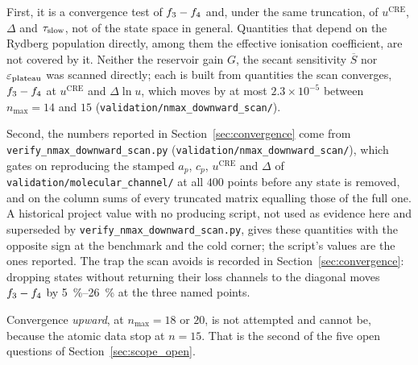 First, it is a convergence test of $f_{3}-f_{4}$ and, under the same
truncation, of $u^{\mathrm{CRE}}$, $\Delta$ and $\tau_{\mathrm{slow}}$, not of the state
space in general. Quantities that depend on the Rydberg population
directly, among them the effective ionisation coefficient, are not covered by
it. Neither the reservoir gain $G$, the secant sensitivity $\overline{S}$ nor
$\varepsilon_{\mathrm{plateau}}$ was scanned directly; each is built from quantities the scan
converges, $f_{3}-f_{4}$ at $u^{\mathrm{CRE}}$ and $\Delta\ln u$, which
moves by at most $2.3\times10^{-5}$ between $n_{\max}=14$ and $15$
(\texttt{validation/nmax\_downward\_scan/}).

Second, the numbers reported in Section~\ref{sec:convergence} come from
\texttt{verify\_nmax\_downward\_scan.py}
(\texttt{validation/nmax\_downward\_scan/}), which gates on reproducing the
stamped $a_p$, $c_p$, $u^{\mathrm{CRE}}$ and $\Delta$ of
\texttt{validation/molecular\_channel/} at all $400$ points before any state
is removed, and on the column sums of every truncated matrix equalling those
of the full one. A historical project value with no producing script, not used
as evidence here and superseded by \texttt{verify\_nmax\_downward\_scan.py},
gives these quantities with the opposite sign at the benchmark and the cold
corner; the script's values are the ones reported. The trap the scan avoids is recorded in Section~\ref{sec:convergence}:
dropping states without returning their loss channels to the diagonal moves
$f_{3}-f_{4}$ by \SIrange{5}{26}{\percent} at the three named points.

Convergence \emph{upward}, at $n_{\max} = 18$ or $20$, is not attempted and
cannot be, because the atomic data stop at $n = 15$. That is the second of the
five open questions of Section~\ref{sec:scope_open}.
